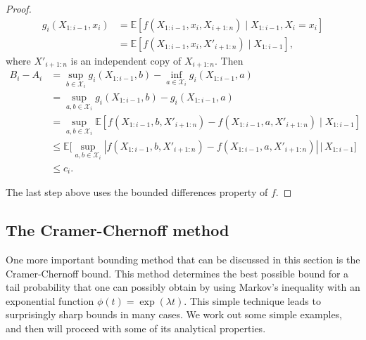 \begin{proof}
\begin{align}
g_i(X_{1:i-1}, x_i) 
&= \mathbb{E}[f(X_{1:i-1}, x_i, X_{i+1:n}) \mid X_{1:i-1}, X_i = x_i]   \\
&= \mathbb{E}[f(X_{1:i-1}, x_i, X'_{i+1:n}) \mid X_{1:i-1}],  
\end{align}
where $X'_{i+1:n}$ is an independent copy of $X_{i+1:n}$. Then
\begin{align}
B_i - A_i 
&= \sup_{b \in \mathcal{X}_i} g_i(X_{1:i-1}, b) - \inf_{a \in \mathcal{X}_i} g_i(X_{1:i-1}, a)   \\
&= \sup_{a,b \in \mathcal{X}_i} g_i(X_{1:i-1}, b) - g_i(X_{1:i-1}, a)  \\
&= \sup_{a,b \in \mathcal{X}_i} \mathbb{E}[f(X_{1:i-1}, b, X'_{i+1:n}) - f(X_{1:i-1}, a, X'_{i+1:n}) \mid X_{1:i-1}]   \\
&\leq \mathbb{E}\Big[\sup_{a,b \in \mathcal{X}_i} |f(X_{1:i-1}, b, X'_{i+1:n}) - f(X_{1:i-1}, a, X'_{i+1:n})| \,\Big|\, X_{1:i-1}\Big]   \\
&\leq c_i.  
\end{align}

The last step above uses the bounded differences property of $f$.
\end{proof}

\subsection{The Cramer-Chernoff method}
One more important bounding method that can be discussed in this section is the Cramer-Chernoff bound. This method determines the best possible bound for a tail probability that one can possibly obtain by using Markov's inequality with an exponential function $\phi(t)=\exp{(\lambda t)}$. This simple technique leads to surprisingly sharp bounds in many cases. We work out some simple examples, and then will proceed with some of its analytical properties. 

